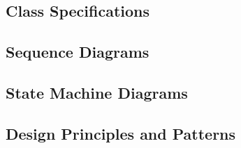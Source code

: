 



\subsection{Class Specifications}\label{ood-class-specifications}



\subsection{Sequence Diagrams}\label{ood-sequence-diagrams}



\subsection{State Machine Diagrams}\label{ood-state-machines}



\subsection{Design Principles and Patterns}\label{ood-patterns}


